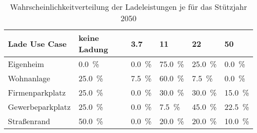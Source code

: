 {
\renewcommand{\arraystretch}{1.2}%
\begin{table}[H]
	\begin{center}
		\caption{Wahrscheinlichkeitverteilung der Ladeleistungen je \UC für das Stützjahr \num{2050}}
		\begin{tabu} to \textwidth {X[1.7] X[1.3, r] X[1, r] X[1, r] X[1, r] X[1, r]}
			\hline
			Lade Use   Case  & keine Ladung        & \SI{3.7}{\kw}      & \SI{11}{\kw}        & \SI{22}{\kw}        & \SI{50}{\kw}        \\ \hline
			Eigenheim        & \SI{0.0}{\percent}  & \SI{0.0}{\percent} & \SI{75.0}{\percent} & \SI{25.0}{\percent} & \SI{0.0}{\percent}  \\
			Wohnanlage       & \SI{25.0}{\percent} & \SI{7.5}{\percent} & \SI{60.0}{\percent} & \SI{7.5}{\percent}  & \SI{0.0}{\percent}  \\
			Firmenparkplatz  & \SI{25.0}{\percent} & \SI{0.0}{\percent} & \SI{30.0}{\percent} & \SI{30.0}{\percent} & \SI{15.0}{\percent} \\
			Gewerbeparkplatz & \SI{25.0}{\percent} & \SI{0.0}{\percent} & \SI{7.5}{\percent}  & \SI{45.0}{\percent} & \SI{22.5}{\percent} \\
			Straßenrand      & \SI{50.0}{\percent} & \SI{0.0}{\percent} & \SI{20.0}{\percent} & \SI{20.0}{\percent} & \SI{10.0}{\percent} \\ \hline
		\end{tabu}
		\label{tab:UCProbability2050}
	\end{center}
	\vspace{-3mm}%
\end{table}
}
